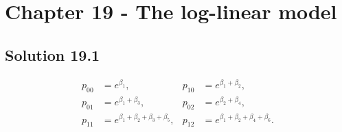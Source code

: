 \section*{Chapter 19 - The log-linear model}

\subsection*{Solution 19.1}

\begin{align*}
    p_{00} &= e^{\beta_1}, & p_{10} &= e^{\beta_1 + \beta_2}, \\
    p_{01} &= e^{\beta_1 + \beta_3}, & p_{02} &= e^{\beta_2 + \beta_4}, \\
    p_{11} &= e^{\beta_1 + \beta_2 + \beta_3 + \beta_5}, & p_{12} &= e^{\beta_1 + \beta_2 + \beta_4 + \beta_6}.
\end{align*}
